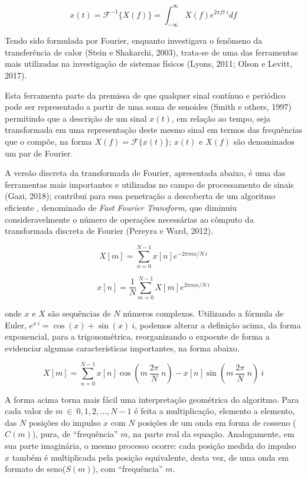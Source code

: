 \documentclass[]{article}
\begin{document}
\begin{equation}
x(t) = \mathcal{F}^{-1}\{X(f)\}=\int_{-\infty}^\infty X(f) e^{2 \pi f t \ i} df
\label{eq:id}\end{equation}

Tendo sido formulada por Fourier, enquanto investigava o fenômeno da
transferência de calor (Stein e Shakarchi, 2003), trata-se de uma das
ferramentas mais utilizadas na investigação de sistemas físicos (Lyons,
2011; Olson e Levitt, 2017).

Esta ferramenta parte da premissa de que qualquer sinal contínuo e
periódico pode ser representado a partir de uma soma de senoides (Smith
e others, 1997) permitindo que a descrição de um sinal \(x(t)\), em
relação ao tempo, seja transformada em uma representação deste mesmo
sinal em termos das frequências que o compõe, na forma
\(X(f)=\mathcal{F}\{x(t)\}\); \(x(t)\) e \(X(f)\) são denominados um par
de Fourier.

A versão discreta da transformada de Fourier, apresentada abaixo, é uma
das ferramentas mais importantes e utilizadas no campo de processamento
de sinais (Gazi, 2018); contribui para essa penetração a descoberta de
um algoritmo eficiente , denominado de \emph{Fast Fourier Transform},
que diminuiu consideravelmente o número de operações necessárias ao
cômputo da transformada discreta de Fourier (Pereyra e Ward, 2012).

\begin{equation}
X[m] =\sum_{n=0}^{N-1} x[n] e^{- 2 \pi m n / N ~ i}
\label{eq:id}\end{equation}

\begin{equation}
x[n] = \frac{1}{N}\sum_{m=0}^{N-1} X[m] e^{2 \pi m n / N ~ i}
\label{eq:id}\end{equation}

onde \(x\) e \(X\) são sequências de \(N\) números complexos. Utilizando
a fórmula de Euler, \(e^{x ~ i} = \cos(x) + \sin(x)~i\), podemos alterar
a definição acima, da forma exponencial, para a trigonométrica,
reorganizando o expoente de forma a evidenciar algumas características
importantes, na forma abaixo.

\[
X[m] =\sum_{n=0}^{N-1}
x[n] \cos \left(m ~ \frac{2 \pi}{N} ~ n \right)-
x[n] \sin\left(m ~ \frac{2 \pi}{N} ~ n \right) ~ i
\]

A forma acima torna mais fácil uma interpretação geométrica do
algoritmo. Para cada valor de \(m ~ \in ~ {0,1,2,...,N-1}\) é feita a
multiplicação, elemento a elemento, das \(N\) posições do impulso \(x\)
com \(N\) posições de um onda em forma de cosseno (\(C(m)\)), pura, de
``frequência'' \(m\), na parte real da equação. Analogamente, em sua
parte imaginária, o mesmo processo ocorre: cada posição medida do
impulso \(x\) também é multiplicada pela posição equivalente, desta vez,
de uma onda em formato de seno(\(S(m)\)), com ``frequência'' \(m\).
\end{document}
